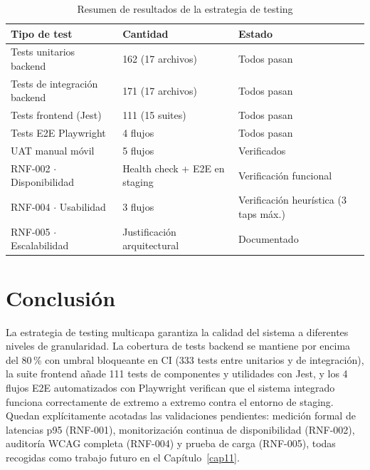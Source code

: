 \begin{table}[htbp]
\centering
\caption{Resumen de resultados de la estrategia de testing}
\label{tab:resumen-pruebas}
\small
\begin{tabular}{@{}lll@{}}
\toprule
\textbf{Tipo de test} & \textbf{Cantidad} & \textbf{Estado} \\
\midrule
Tests unitarios backend & 162 (17 archivos) & Todos pasan \\
Tests de integraci\'on backend & 171 (17 archivos) & Todos pasan \\
Tests frontend (Jest) & 111 (15 suites) & Todos pasan \\
Tests E2E Playwright & 4 flujos & Todos pasan \\
UAT manual m\'ovil & 5 flujos & Verificados \\
RNF-002 $\cdot$ Disponibilidad & Health check + E2E en staging & Verificaci\'on funcional \\
RNF-004 $\cdot$ Usabilidad & 3 flujos & Verificaci\'on heur\'istica (3 taps m\'ax.) \\
RNF-005 $\cdot$ Escalabilidad & Justificaci\'on arquitectural & Documentado \\
\bottomrule
\end{tabular}
\end{table}

\section{Conclusi\'on}\label{sec:conclusion-pruebas}

La estrategia de testing multicapa garantiza la calidad del sistema a diferentes niveles de
granularidad. La cobertura de tests backend se mantiene por encima del 80\,\% con umbral
bloqueante en CI (333 tests entre unitarios y de integraci\'on), la suite frontend a\~nade 111
tests de componentes y utilidades con Jest, y los 4 flujos E2E automatizados con Playwright
verifican que el sistema integrado funciona correctamente de extremo a extremo contra el
entorno de staging. Quedan expl\'icitamente acotadas las validaciones pendientes: medici\'on
formal de latencias p95 (RNF-001), monitorizaci\'on continua de disponibilidad (RNF-002),
auditor\'ia WCAG completa (RNF-004) y prueba de carga (RNF-005), todas recogidas como trabajo
futuro en el Cap\'itulo~\ref{cap11}.
